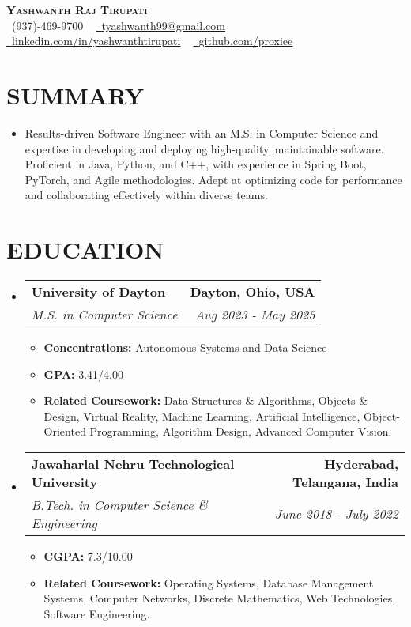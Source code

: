 \documentclass[letterpaper,11pt]{article}
\makeatletter
\newcommand{\resumeItem}[1]{\item\small{{#1 \vspace{-3pt}}}}
\newcommand{\resumeSubheading}[4]{\vspace{-2pt}\item\begin{tabular*}{0.97\textwidth}[t]{l@{\extracolsep{\fill}}r}\textbf{#1} & #2 \\\textit{\small#3} & \textit{\small #4} \\\end{tabular*}\vspace{-7pt}}
\newcommand{\resumeSubHeadingListStart}{\begin{itemize}[leftmargin=0.15in, label={}]}
\newcommand{\resumeSubHeadingListEnd}{\end{itemize}}
\newcommand{\resumeItemListStart}{\begin{itemize}}
\newcommand{\resumeItemListEnd}{\end{itemize}\vspace{-5pt}}
\makeatother
\begin{document}
\begin{center}
    \textbf{\Huge \scshape {\fontsize{15pt}{20pt}\selectfont Yashwanth Raj Tirupati}} \\ \vspace{1pt}
    \small \raisebox{-0.1\height}\faPhone\ (937)-469-9700 ~ \href{mailto:tyashwanth99@gmail.com}{\raisebox{-0.2\height}\faEnvelope\  \underline{tyashwanth99@gmail.com}} ~ 
    \href{https://linkedin.com/in/yashwanthtirupati}{\raisebox{-0.2\height}\faLinkedin\ \underline{linkedin.com/in/yashwanthtirupati}} ~ 
    \href{https://github.com/proxiee}{\raisebox{-0.2\height}\faGithub\ \underline{github.com/proxiee}}
    \vspace{-8pt}
\end{center}


\section{{\fontsize{9pt}{20pt}\selectfont \textbf{SUMMARY}}}
\resumeSubHeadingListStart

\resumeItem{Results-driven Software Engineer with an M.S. in Computer Science and expertise in developing and deploying high-quality, maintainable software. Proficient in Java, Python, and C++, with experience in Spring Boot, PyTorch, and Agile methodologies.  Adept at optimizing code for performance and collaborating effectively within diverse teams.}
\resumeSubHeadingListEnd
\vspace{-18pt}

\section{{\fontsize{9pt}{20pt}\selectfont \textbf{EDUCATION}}}
\resumeSubHeadingListStart
\resumeSubheading{University of Dayton}{\textbf{Dayton, Ohio, USA}}{M.S. in Computer Science}{Aug 2023 - May 2025}
\resumeItemListStart
\resumeItem{\textbf{Concentrations:} Autonomous Systems and Data Science}
\resumeItem{\textbf{GPA:} 3.41/4.00}
\resumeItem{\textbf{Related Coursework:} Data Structures \& Algorithms, Objects \& Design, Virtual Reality, Machine Learning, Artificial Intelligence, Object-Oriented Programming, Algorithm Design, Advanced Computer Vision.}
\resumeItemListEnd
\resumeSubheading{Jawaharlal Nehru Technological University}{\textbf{Hyderabad, Telangana, India}}{B.Tech. in Computer Science \& Engineering}{June 2018 - July 2022}
\resumeItemListStart
\resumeItem{\textbf{CGPA:} 7.3/10.00}
\resumeItem{\textbf{Related Coursework:} Operating Systems, Database Management Systems, Computer Networks, Discrete Mathematics, Web Technologies, Software Engineering.}
\resumeItemListEnd
\resumeSubHeadingListEnd
\vspace{-18pt}
\end{document}
